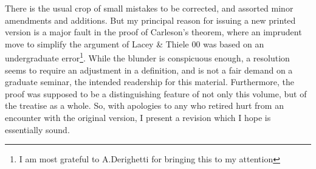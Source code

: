 \bigskip


\medskip

There is the usual crop of small mistakes to be corrected, and assorted minor
amendments and additions.   But my principal reason for issuing a new printed
version is a major fault in the proof of Carleson's theorem, where an imprudent
move to simplify the argument of {\smc Lacey \& Thiele 00} was based on an
undergraduate error\footnote{I am most
grateful to A.Derighetti for bringing this to my attention}.   
While the blunder is conspicuous enough, a resolution
seems to require an adjustment in a definition, and is not a fair demand on
a graduate seminar, the intended readership for this material.
Furthermore, the proof was supposed to be a distinguishing feature of not
only this volume, but of the treatise as a whole.   So, with apologies to any
who retired hurt from an encounter with the original version, I present a
revision which I hope is essentially sound.

\frnewpage 
 
